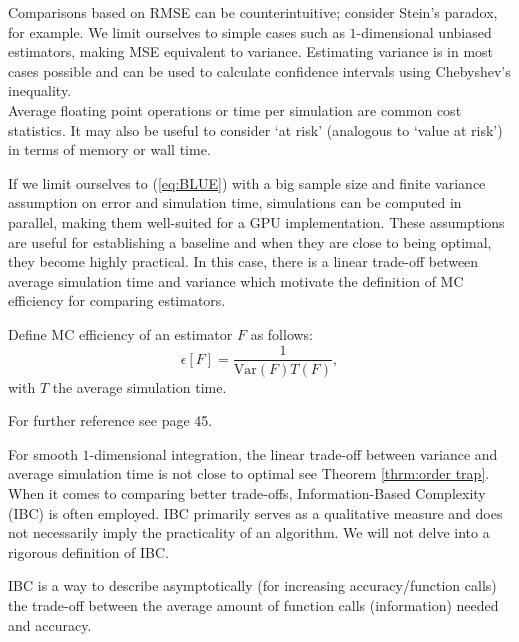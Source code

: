 \documentclass[a4paper,12pt]{article}
\begin{document}
Comparisons based on RMSE can be counterintuitive; consider Stein's paradox,
for example. We limit ourselves to simple cases such as $1$-dimensional
unbiased estimators, making MSE equivalent to variance.
Estimating variance is in most cases possible and can be used to calculate
confidence intervals using Chebyshev's inequality.\\

Average floating point operations or time per simulation are common cost statistics.
It may also be useful to consider \enquote*{at risk}  (analogous to \enquote*{value at risk})
in terms of memory or wall time.

If we limit ourselves to (\ref{eq:BLUE}) with a big sample size and
finite variance assumption on error and simulation time,
simulations can be computed in parallel, making them well-suited for a GPU implementation.
These assumptions are useful for establishing a baseline and
when they are close to being optimal, they become highly practical.
In this case, there is a linear trade-off
between average simulation time and variance which motivate
the definition of MC efficiency for comparing estimators.

\begin{definition}
  Define MC efficiency of an
  estimator $F$ as follows:
  \begin{equation}
    \epsilon[F]=\frac{1}{\text{Var}(F) T(F)},
  \end{equation}
  with $T$ the average simulation time.
\end{definition}

\begin{related}
  For further reference see \cite{veach_robust_1997} page 45.
\end{related}

For smooth $1$-dimensional integration, the linear trade-off between
variance and average simulation time is not close to optimal see
Theorem \ref{thrm:order trap}. \\
When it comes to comparing better trade-offs,
Information-Based Complexity (IBC) is often employed.
IBC primarily serves as a
qualitative measure and does not necessarily imply the
practicality of an algorithm. We will not delve into a
rigorous definition of IBC.

\begin{definition}
  IBC is a way to describe asymptotically (for increasing accuracy/function calls)
  the trade-off between the average amount of function calls (information)
  needed and accuracy.
\end{definition}
\end{document}
